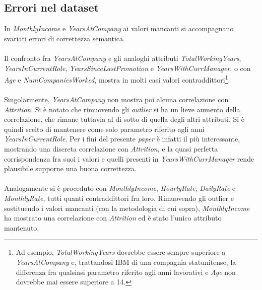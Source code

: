 \subsection{Errori nel dataset}
In \textit{MonthlyIncome} e \textit{YearsAtCompany} ai valori mancanti si accompagnano svariati errori di correttezza semantica.\\\\
Il confronto fra \textit{YearsAtCompany} e gli analoghi attributi \textit{TotalWorkingYears}, \textit{YearsInCurrentRole}, \textit{YearsSinceLastPromotion} e \textit{YearsWithCurrManager}, o con \textit{Age} e \textit{NumCompaniesWorked}, mostra in molti casi valori contraddittori\footnote{Ad esempio, \textit{TotalWorkingYears} dovrebbe essere sempre superiore a \textit{YearsAtCompany} e, trattandosi IBM di una compagnia statunitense, la differenza fra qualsiasi parametro riferito agli anni lavorativi e \textit{Age} non dovrebbe mai essere superiore a 14.}. \\\\ Singolarmente, \textit{YearsAtCompany} non mostra poi alcuna correlazione con \textit{Attrition}. Si è notato che rimuovendo gli \textit{outlier} si ha un lieve aumento della correlazione, che rimane tuttavia al di sotto di quella degli altri attributi. Si è quindi scelto di mantenere come solo parametro riferito agli anni \textit{YearsInCurrentRole}. Per i fini del presente \textit{paper} è infatti il più interessante, mostrando una discreta correlazione con \textit{Attrition}, e la quasi perfetta corrispondenza fra suoi i valori e quelli presenti in \textit{YearsWithCurrManager} rende plausibile supporne una buona correttezza.\\\\
Analogamente si è proceduto con \textit{MonthlyIncome}, \textit{HourlyRate},  \textit{DailyRate} e \textit{MonthlyRate}, tutti quanti contraddittori fra loro. Rimuovendo gli outlier e sostituendo i valori mancanti (con la metodologia di cui sopra), \textit{MonthlyIncome} ha mostrato una correlazione con \textit{Attrition} ed è stato l'unico attributo mantenuto. 

